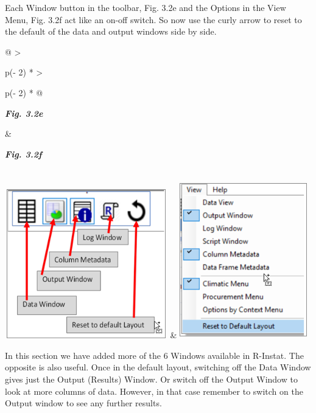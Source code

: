 \documentclass[
  letterpaper,
  DIV=11,
  numbers=noendperiod]{scrreprt}
\begin{document}
Each Window button in the toolbar, Fig. 3.2e and the Options in the View
Menu, Fig. 3.2f act like an on-off switch. So now use the curly arrow to
reset to the default of the data and output windows side by side.

\begin{longtable}[]{@{}
  >{\raggedright\arraybackslash}p{(\columnwidth - 2\tabcolsep) * }
  >{\raggedright\arraybackslash}p{(\columnwidth - 2\tabcolsep) * }@{}}
\toprule\noalign{}
\begin{minipage}[b]{\linewidth}\raggedright
\textbf{\emph{Fig. 3.2e}}
\end{minipage} & \begin{minipage}[b]{\linewidth}\raggedright
\textbf{\emph{Fig. 3.2f}}
\end{minipage} \\
\midrule\noalign{}
\endhead
\bottomrule\noalign{}
\endlastfoot
\includegraphics[width=2.77954in,height=2.55545in]{figures/Fig3.2e.png}
&
\includegraphics[width=2.18067in,height=2.70153in]{figures/Fig3.2f.png} \\
\end{longtable}

In this section we have added more of the 6 Windows available in
R-Instat. The opposite is also useful. Once in the default layout,
switching off the Data Window gives just the Output (Results) Window. Or
switch off the Output Window to look at more columns of data. However,
in that case remember to switch on the Output window to see any further
results.
\end{document}
